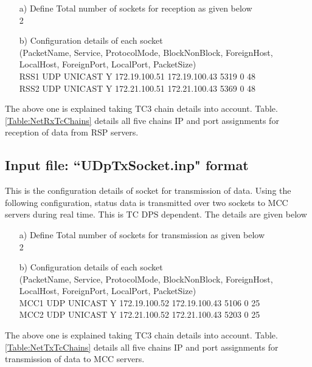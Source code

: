 \begin{enumerate}
	\item [a)] Define Total number of sockets for reception as given below\\
	2
	\item [b)] Configuration details of each socket\\
	(PacketName, Service, ProtocolMode, BlockNonBlock, ForeignHost, LocalHost, ForeignPort, LocalPort, PacketSize)\\
RSS1	UDP	UNICAST	Y	172.19.100.51	172.19.100.43	5319	0	48\\
RSS2	UDP	UNICAST	Y	172.21.100.51	172.21.100.43	5369	0	48\\
\end{enumerate}
The above one is explained taking TC3 chain details into account. Table. \ref{Table:NetRxTcChains} details all five chains IP and port assignments for reception of data from RSP servers.

\subsection{Input file: ``UDpTxSocket.inp" format}
\label{Label:TXSoc}
This is the configuration details of socket for transmission of data. Using the following configuration, status data is transmitted over two sockets to MCC servers during real time. This is TC DPS dependent. The details are given below
\begin{enumerate}
	\item [a)] Define Total number of sockets for transmission as given below\\
	2
	\item [b)] Configuration details of each socket\\
	(PacketName, Service, ProtocolMode, BlockNonBlock, ForeignHost, LocalHost, ForeignPort, LocalPort, PacketSize)\\
	MCC1	UDP	UNICAST	Y	172.19.100.52	172.19.100.43	5106	0	25 \\
	MCC2	UDP	UNICAST	Y	172.21.100.52	172.21.100.43	5203	0	25\\ 
	\end{enumerate}
The above one is explained taking TC3 chain details into account. Table. \ref{Table:NetTxTcChains} details all five chains IP and port assignments for transmission of data to MCC servers.

